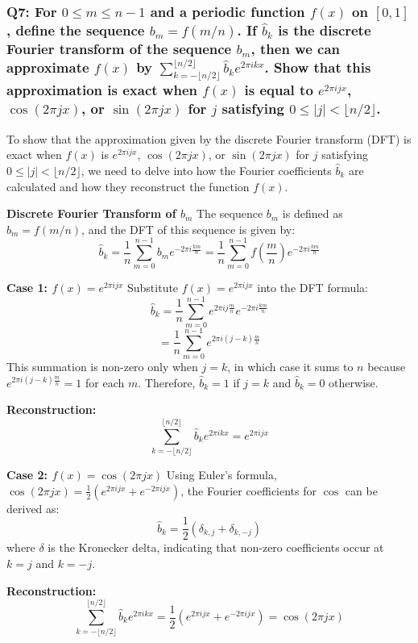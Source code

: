 \documentclass[8pt]{article}
\begin{document}
\subsubsection*{Q7:
For \(0 \leq m \leq n - 1\) and a periodic function \(f(x)\) on \([0,1]\), define the sequence \(b_m = f(m/n)\). If \(\hat{b}_k\) is the discrete Fourier transform of the sequence \(b_m\), then we can approximate \(f(x)\) by \(\sum_{k=-\lfloor n/2 \rfloor}^{\lfloor n/2 \rfloor} \hat{b}_k e^{2\pi ikx}\). Show that this approximation is exact when \(f(x)\) is equal to \(e^{2\pi ijx}\), \(\cos(2\pi jx)\), or \(\sin(2\pi jx)\) for \(j\) satisfying \(0 \leq |j| < \lfloor n/2 \rfloor\).}

To show that the approximation given by the discrete Fourier transform (DFT) is exact when \(f(x)\) is \(e^{2\pi ijx}\), \(\cos(2\pi jx)\), or \(\sin(2\pi jx)\) for \(j\) satisfying \(0 \leq |j| < \lfloor n/2 \rfloor\), we need to delve into how the Fourier coefficients \(\hat{b}_k\) are calculated and how they reconstruct the function \(f(x)\).

\textbf{Discrete Fourier Transform of \(b_m\)}
The sequence \(b_m\) is defined as \(b_m = f(m/n)\), and the DFT of this sequence is given by:
\[
\hat{b}_k = \frac{1}{n} \sum_{m=0}^{n-1} b_m e^{-2\pi i \frac{km}{n}} = \frac{1}{n} \sum_{m=0}^{n-1} f\left(\frac{m}{n}\right) e^{-2\pi i \frac{km}{n}}
\]

\textbf{Case 1: \(f(x) = e^{2\pi ijx}\)}
Substitute \(f(x) = e^{2\pi ijx}\) into the DFT formula:
\[
\hat{b}_k = \frac{1}{n} \sum_{m=0}^{n-1} e^{2\pi ij\frac{m}{n}} e^{-2\pi i \frac{km}{n}}
\]
\[
= \frac{1}{n} \sum_{m=0}^{n-1} e^{2\pi i(j-k)\frac{m}{n}}
\]
This summation is non-zero only when \(j = k\), in which case it sums to \(n\) because \(e^{2\pi i(j-k)\frac{m}{n}} = 1\) for each \(m\). Therefore, \(\hat{b}_k = 1\) if \(j = k\) and \(\hat{b}_k = 0\) otherwise.

\textbf{Reconstruction:}
\[
\sum_{k=-\lfloor n/2 \rfloor}^{\lfloor n/2 \rfloor} \hat{b}_k e^{2\pi ikx} = e^{2\pi ijx}
\]

\textbf{Case 2: \(f(x) = \cos(2\pi jx)\)}
Using Euler's formula, \(\cos(2\pi jx) = \frac{1}{2} (e^{2\pi ijx} + e^{-2\pi ijx})\), the Fourier coefficients for \(\cos\) can be derived as:
\[
\hat{b}_k = \frac{1}{2}(\delta_{k, j} + \delta_{k, -j})
\]
where \(\delta\) is the Kronecker delta, indicating that non-zero coefficients occur at \(k = j\) and \(k = -j\).

\textbf{Reconstruction:}
\[
\sum_{k=-\lfloor n/2 \rfloor}^{\lfloor n/2 \rfloor} \hat{b}_k e^{2\pi ikx} = \frac{1}{2} (e^{2\pi ijx} + e^{-2\pi ijx}) = \cos(2\pi jx)
\]
\end{document}
